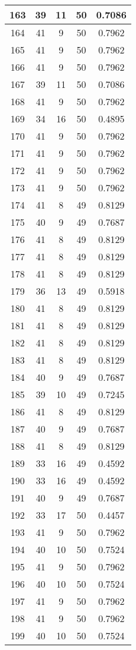 \documentclass[letterpaper, 12pt]{article}
\begin{document}
\begin{longtable}{|c|c|c|c|c|}
\hline
163 & 39 & 11 & 50 & 0.7086 \\
\hline
164 & 41 & 9 & 50 & 0.7962 \\
\hline
165 & 41 & 9 & 50 & 0.7962 \\
\hline
166 & 41 & 9 & 50 & 0.7962 \\
\hline
167 & 39 & 11 & 50 & 0.7086 \\
\hline
168 & 41 & 9 & 50 & 0.7962 \\
\hline
169 & 34 & 16 & 50 & 0.4895 \\
\hline
170 & 41 & 9 & 50 & 0.7962 \\
\hline
171 & 41 & 9 & 50 & 0.7962 \\
\hline
172 & 41 & 9 & 50 & 0.7962 \\
\hline
173 & 41 & 9 & 50 & 0.7962 \\
\hline
174 & 41 & 8 & 49 & 0.8129 \\
\hline
175 & 40 & 9 & 49 & 0.7687 \\
\hline
176 & 41 & 8 & 49 & 0.8129 \\
\hline
177 & 41 & 8 & 49 & 0.8129 \\
\hline
178 & 41 & 8 & 49 & 0.8129 \\
\hline
179 & 36 & 13 & 49 & 0.5918 \\
\hline
180 & 41 & 8 & 49 & 0.8129 \\
\hline
181 & 41 & 8 & 49 & 0.8129 \\
\hline
182 & 41 & 8 & 49 & 0.8129 \\
\hline
183 & 41 & 8 & 49 & 0.8129 \\
\hline
184 & 40 & 9 & 49 & 0.7687 \\
\hline
185 & 39 & 10 & 49 & 0.7245 \\
\hline
186 & 41 & 8 & 49 & 0.8129 \\
\hline
187 & 40 & 9 & 49 & 0.7687 \\
\hline
188 & 41 & 8 & 49 & 0.8129 \\
\hline
189 & 33 & 16 & 49 & 0.4592 \\
\hline
190 & 33 & 16 & 49 & 0.4592 \\
\hline
191 & 40 & 9 & 49 & 0.7687 \\
\hline
192 & 33 & 17 & 50 & 0.4457 \\
\hline
193 & 41 & 9 & 50 & 0.7962 \\
\hline
194 & 40 & 10 & 50 & 0.7524 \\
\hline
195 & 41 & 9 & 50 & 0.7962 \\
\hline
196 & 40 & 10 & 50 & 0.7524 \\
\hline
197 & 41 & 9 & 50 & 0.7962 \\
\hline
198 & 41 & 9 & 50 & 0.7962 \\
\hline
199 & 40 & 10 & 50 & 0.7524 \\
\hline
\end{longtable}
\end{document}
